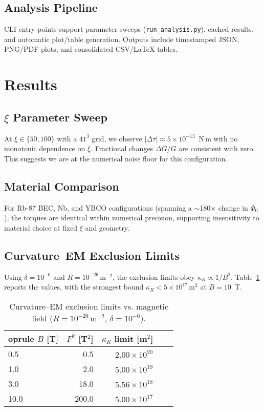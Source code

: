 \documentclass[10pt,twocolumn]{article}
\begin{document}
\subsection{Analysis Pipeline}
CLI entry-points support parameter sweeps (\texttt{run\_analysis.py}), cached results, and automatic plot/table generation. Outputs include timestamped JSON, PNG/PDF plots, and consolidated CSV/LaTeX tables.

\section{Results}
\subsection{$\xi$ Parameter Sweep}
At $\xi\in\{50,100\}$ with a $41^3$ grid, we observe $\lvert\Delta\tau\rvert \approx 5\times10^{-13}$~N\,m with no monotonic dependence on $\xi$. Fractional changes $\Delta G/G$ are consistent with zero. This suggests we are at the numerical noise floor for this configuration.

\subsection{Material Comparison}
For Rb-87 BEC, Nb, and YBCO configurations (spanning a $\sim$180$\times$ change in $\Phi_0$), the torques are identical within numerical precision, supporting insensitivity to material choice at fixed $\xi$ and geometry.

\subsection{Curvature--EM Exclusion Limits}
Using $\delta=10^{-6}$ and $R=10^{-26}\,\mathrm{m^{-2}}$, the exclusion limits obey $\kappa_R\propto 1/B^2$. Table~\ref{tab:kappaB} reports the values, with the strongest bound $\kappa_R<5\times10^{17}\,\mathrm{m^2}$ at $B=10$~T.

\begin{table}[t]
  \centering
  \caption{Curvature--EM exclusion limits vs. magnetic field ($R=10^{-26}\,\mathrm{m^{-2}}$, $\delta=10^{-6}$).}
  \label{tab:kappaB}
  \begin{tabular}{@{}lrrrr@{}}
    	oprule
    $B$ [T] & $F^2$ [T$^2$] & $\kappa_R$ limit [m$^2$] \\
    \midrule
    0.5  &  0.5  & $2.00\times10^{20}$ \\
    1.0  &  2.0  & $5.00\times10^{19}$ \\
    3.0  & 18.0  & $5.56\times10^{18}$ \\
    10.0 & 200.0 & $5.00\times10^{17}$ \\
    \bottomrule
  \end{tabular}
\end{table}
\end{document}
